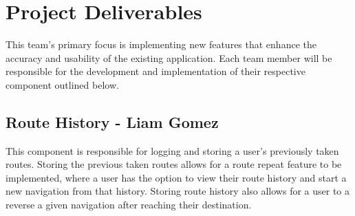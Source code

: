 \documentclass{scrreprt}
\begin{document}
\chapter{Project Deliverables}
This team’s primary focus is implementing new features that enhance the accuracy and usability of the existing application. Each team member will be responsible for the development and implementation of their respective component outlined below.

\section{Route History - Liam Gomez}
This component is responsible for logging and storing a user’s previously taken routes. Storing the previous taken routes allows for a route repeat feature to be implemented, where a user has the option to view their route history and start a new navigation from that history. Storing route history also allows for a user to a reverse a given navigation after reaching their destination.
\end{document}
